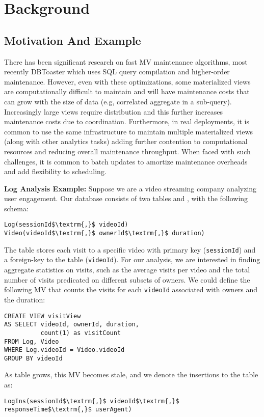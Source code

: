 \section{Background}\label{sec-background}

\subsection{Motivation And Example}\label{subsec-inc}
There has been significant research on fast MV maintenance algorithms, most recently DBToaster \cite{DBLP:journals/vldb/KochAKNNLS14} which uses SQL query compilation and higher-order maintenance.
However, even with these optimizations, some materialized views are computationally difficult to maintain and will have maintenance costs that can grow with the size of data (e.g, correlated aggregate in a sub-query).
Increasingly large views require distribution and this further increases maintenance costs due to coordination.
Furthermore, in real deployments, it is common to use the same infrastructure to maintain multiple materialized views (along with other analytics tasks) adding further contention to computational resources and reducing overall maintenance throughput. 
When faced with such challenges, it is common to batch updates to amortize maintenance overheads and add flexibility to scheduling.

\noindent \textbf{Log Analysis Example: } 
Suppose we are a video streaming company analyzing user engagement.
Our database consists of two tables  and , with the following schema:
\begin{lstlisting}[mathescape,basicstyle={\scriptsize}]
Log(sessionId$\textrm{,}$ videoId)
Video(videoId$\textrm{,}$ ownerId$\textrm{,}$ duration)
\end{lstlisting}
The  table stores each visit to a specific video with primary key (\texttt{sessionId}) and a foreign-key to the  table (\texttt{videoId}).
For our analysis, we are interested in finding aggregate statistics on visits, such as the average visits per video and the total number of visits predicated on different subsets of owners. 
We could define the following MV that counts the visits for each \texttt{videoId} associated with owners and the duration: 
\begin{lstlisting}[mathescape,basicstyle={\scriptsize}]
CREATE VIEW visitView
AS SELECT videoId, ownerId, duration,
          count(1) as visitCount
FROM Log, Video
WHERE Log.videoId = Video.videoId
GROUP BY videoId
\end{lstlisting}
As  table grows, this MV becomes stale, and we denote the insertions to the table as:
\begin{lstlisting}[mathescape,basicstyle={\scriptsize}]
LogIns(sessionId$\textrm{,}$ videoId$\textrm{,}$ responseTime$\textrm{,}$ userAgent)
\end{lstlisting}

